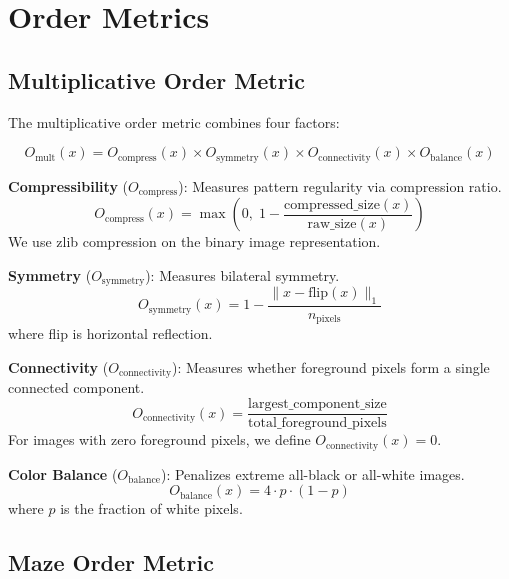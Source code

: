 


\section{Order Metrics}
\label{app:metrics}

\subsection{Multiplicative Order Metric}

The multiplicative order metric combines four factors:

\begin{equation}
O_{\text{mult}}(x) = O_{\text{compress}}(x) \times O_{\text{symmetry}}(x) \times O_{\text{connectivity}}(x) \times O_{\text{balance}}(x)
\end{equation}

\textbf{Compressibility} ($O_{\text{compress}}$): Measures pattern regularity via compression ratio.
\begin{equation}
O_{\text{compress}}(x) = \max\!\left(0,\;1 - \frac{\text{compressed\_size}(x)}{\text{raw\_size}(x)}\right)
\end{equation}
We use zlib compression on the binary image representation.

\textbf{Symmetry} ($O_{\text{symmetry}}$): Measures bilateral symmetry.
\begin{equation}
O_{\text{symmetry}}(x) = 1 - \frac{\|x - \text{flip}(x)\|_1}{n_{\text{pixels}}}
\end{equation}
where flip is horizontal reflection.

\textbf{Connectivity} ($O_{\text{connectivity}}$): Measures whether foreground pixels form a single connected component.
\begin{equation}
O_{\text{connectivity}}(x) = \frac{\text{largest\_component\_size}}{\text{total\_foreground\_pixels}}
\end{equation}
For images with zero foreground pixels, we define $O_{\text{connectivity}}(x)=0$.

\textbf{Color Balance} ($O_{\text{balance}}$): Penalizes extreme all-black or all-white images.
\begin{equation}
O_{\text{balance}}(x) = 4 \cdot p \cdot (1-p)
\end{equation}
where $p$ is the fraction of white pixels.

\subsection{Maze Order Metric}

